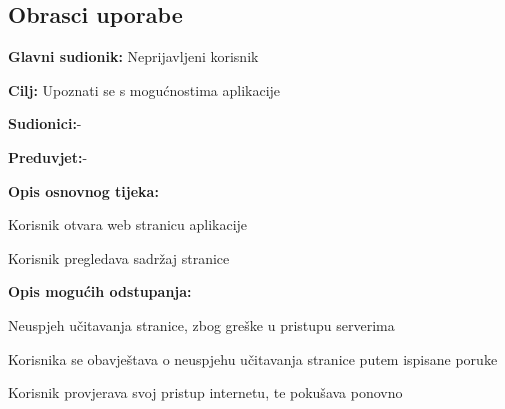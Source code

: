 			\subsection{Obrasci uporabe}
					\noindent {}
					\begin{packed_item}
	
						\item \textbf{Glavni sudionik: }Neprijavljeni korisnik
						\item  \textbf{Cilj:} Upoznati se s mogućnostima aplikacije
						\item  \textbf{Sudionici:}-
						\item  \textbf{Preduvjet:}-
						\item  \textbf{Opis osnovnog tijeka:}
						
						\item[] \begin{packed_enum}
	
							\item Korisnik otvara web stranicu aplikacije
							\item Korisnik pregledava sadržaj stranice
						\end{packed_enum}
						\item  \textbf{Opis mogućih odstupanja:}
						\item[] \begin{packed_item}
						
							\item[1.a] Neuspjeh učitavanja stranice, zbog greške u pristupu serverima
							\item[] \begin{packed_enum}
							
								\item Korisnika se obavještava o neuspjehu učitavanja stranice putem ispisane poruke
								\item Korisnik provjerava svoj pristup internetu, te pokušava ponovno
							
							\end{packed_enum}
						\end{packed_item}
					\end{packed_item}
					\noindent {}
